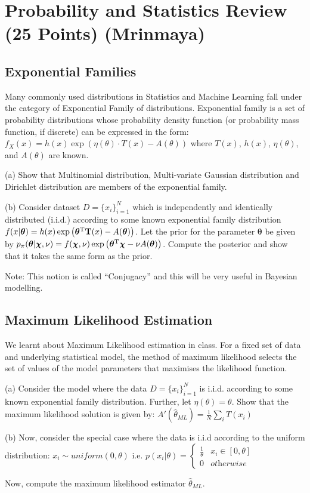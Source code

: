 \section{Probability and Statistics Review (25 Points) (Mrinmaya)}
\subsection{Exponential Families}
Many commonly used distributions in Statistics and Machine Learning fall under the category of Exponential Family of distributions. Exponential family is a set of probability distributions whose probability density function (or probability mass function, if discrete) can be expressed in the form: $f_X(x) = h(x) \exp \left (\eta(\theta) \cdot T(x) -A(\theta)\right )$ where $T(x)$, $h(x)$, $\eta(\theta)$, and $A(\theta)$ are known.

(a) Show that Multinomial distribution, Multi-variate Gaussian distribution and Dirichlet distribution are members of the exponential family.

(b) Consider dataset $D=\{x_i\}_{i=1}^N$ which is independently and identically distributed (i.i.d.) according to some known exponential family distribution $f(x|\boldsymbol\theta) = h(x) \exp \left ( {\boldsymbol\theta}^{\rm T}\mathbf{T}(x) -A(\boldsymbol\theta)\right )$. Let the prior for the parameter $\boldsymbol\theta$ be given by
$p_\pi(\boldsymbol\theta|\boldsymbol\chi,\nu) = f(\boldsymbol\chi,\nu) \exp \left (\boldsymbol\theta^{\rm T} \boldsymbol\chi - \nu A(\boldsymbol\theta) \right )$. Compute the posterior and show that it takes the same form as the prior.

Note: This notion is called ``Conjugacy'' and this will be very useful in Bayesian modelling.

\subsection{Maximum Likelihood Estimation}
We learnt about Maximum Likelihood estimation in class. For a fixed set of data and underlying statistical model, the method of maximum likelihood selects the set of values of the model parameters that maximises the likelihood function.

(a) Consider the model where the data $D=\{x_i\}_{i=1}^N$ is i.i.d. according to some known exponential family distribution. Further, let $\eta(\theta) = \theta$. Show that the maximum likelihood solution is given by: $A'(\hat\theta_{ML}) = \frac{1}{N}\sum\limits_i T(x_i)$

(b) Now, consider the special case where the data is i.i.d according to the uniform distribution: $x_i \sim \textit{uniform}(0, \theta)$ i.e. $p(x_i|\theta) = \begin{cases} 
\frac{1}{\theta} & x_i \in [0, \theta] \\ 
0 & \textit{otherwise}
\end{cases}$

Now, compute the maximum likelihood estimator $\hat\theta_{ML}$.